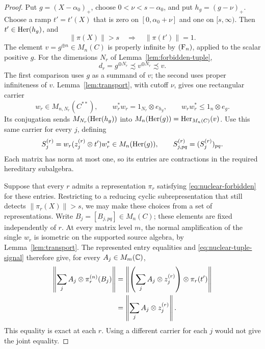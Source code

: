 \begin{proof}
Put \(g=(X-\alpha_0)_+\), choose \(0<\nu<s-\alpha_0\), and put
\(h_g=(g-\nu)_+\).  Choose a ramp \(t'=t'(X)\) that is zero on
\([0,\alpha_0+\nu]\) and one on \([s,\infty)\).  Then
\(t'\in\operatorname{Her}(h_g)\), and
\begin{equation}\label{eq:nuclear-tuple-signal}
 \|\pi(X)\|>s\quad\Longrightarrow\quad\|\pi(t')\|=1.
\end{equation}
The element \(v=g^{\oplus n}\in M_n(C)\) is properly infinite by
\(\textup{(F\ensuremath{_n})}\), applied to the scalar positive \(g\).  For the dimensions
\(N_r\) of Lemma~\ref{lem:forbidden-tuple},
\[
 d_r=g^{\oplus N_r}\precsim v^{\oplus N_r}\precsim v.
\]
The first comparison uses \(g\) as a summand of \(v\); the second
uses proper infiniteness of \(v\).  Lemma~\ref{lem:transport}, with
cutoff \(\nu\), gives one rectangular carrier
\[
 w_r\in M_{n,N_r}(C^{**}),\qquad
 w_r^*w_r=1_{N_r}\otimes e_{h_g},\qquad
 w_rw_r^*\le1_n\otimes e_g.
\]
Its conjugation sends \(M_{N_r}(\operatorname{Her}(h_g))\) into
\(M_n(\operatorname{Her}(g))=\operatorname{Her}_{M_n(C)}(v)\).  Use this same carrier for every
\(j\), defining
\begin{equation}\label{eq:nuclear-tuple-choices}
 S_j^{(r)}=w_r(z_j^{(r)}\otimes t')w_r^*
 \in M_n(\operatorname{Her}(g)),\qquad
 S_{j,pq}^{(r)}=(S_j^{(r)})_{pq}.
\end{equation}
Each matrix has norm at most one, so its entries are contractions in
the required hereditary subalgebra.

Suppose that every \(r\) admits a representation \(\pi_r\) satisfying
\eqref{eq:nuclear-forbidden} for these entries.  Restricting to a
reducing cyclic subrepresentation that still detects
\(\|\pi_r(X)\|>s\), we may make these choices from a set of
representations.  Write
\(B_j=[B_{j,pq}]\in M_n(C)\); these elements are fixed independently
of \(r\).  At every matrix level \(m\), the normal amplification of
the single \(w_r\) is isometric on the supported source algebra, by
Lemma~\ref{lem:transport}.  The represented entry equalities and
\eqref{eq:nuclear-tuple-signal} therefore give, for every
\(A_j\in M_m(\mathbb C)\),
\begin{align}
 \left\|\sum_j A_j\otimes\pi_r^{(n)}(B_j)\right\|
 &=\left\|\left(\sum_j A_j\otimes z_j^{(r)}\right)
       \otimes\pi_r(t')\right\|\notag\\
 &=\left\|\sum_j A_j\otimes z_j^{(r)}\right\|.
 \label{eq:nuclear-exact-matrix-norms}
\end{align}
This equality is exact at each \(r\).  Using a different carrier for
each \(j\) would not give the joint equality.


\end{proof}
